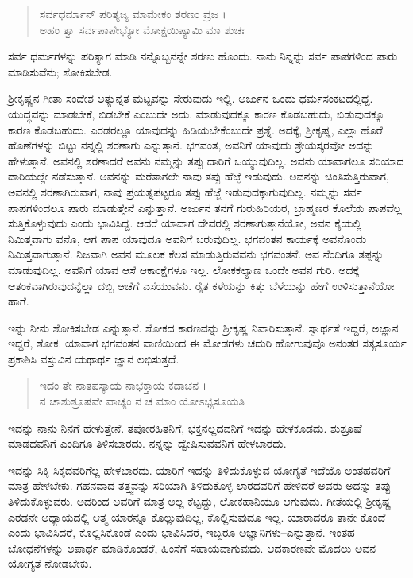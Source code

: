 \begin{verse}
ಸರ್ವಧರ್ಮಾನ್ ಪರಿತ್ಯಜ್ಯ ಮಾಮೇಕಂ ಶರಣಂ ವ್ರಜ ।\\ಅಹಂ ತ್ವಾ ಸರ್ವಪಾಪೇಭ್ಯೋ ಮೋಕ್ಷಯಿಷ್ಯಾಮಿ ಮಾ ಶುಚಃ 
\end{verse}

{\small ಸರ್ವ ಧರ್ಮಗಳನ್ನು ಪರಿತ್ಯಾಗ ಮಾಡಿ ನನ್ನೊಬ್ಬನನ್ನೇ ಶರಣು ಹೊಂದು. ನಾನು ನಿನ್ನನ್ನು ಸರ್ವ ಪಾಪಗಳಿಂದ ಪಾರು ಮಾಡಿಸುವೆನು; ಶೋಕಿಸಬೇಡ.}

ಶ್ರೀಕೃಷ್ಣನ ಗೀತಾ ಸಂದೇಶ ಅತ್ಯುನ್ನತ ಮಟ್ಟವನ್ನು ಸೇರುವುದು ಇಲ್ಲಿ. ಅರ್ಜುನ ಒಂದು ಧರ್ಮಸಂಕಟದಲ್ಲಿದ್ದ. ಯುದ್ಧವನ್ನು ಮಾಡಬೇಕೆ, ಬಿಡಬೇಕೆ ಎಂಬುದೇ ಅದು. ಮಾಡುವುದಕ್ಕೂ ಕಾರಣ ಕೊಡಬಹುದು, ಬಿಡುವುದಕ್ಕೂ ಕಾರಣ ಕೊಡಬಹುದು. ಎರಡರಲ್ಲೂ ಯಾವುದನ್ನು ಹಿಡಿಯಬೇಕೆಂಬುದೇ ಪ್ರಶ್ನೆ. ಅದಕ್ಕೆ, ಶ್ರೀಕೃಷ್ಣ, ಎಲ್ಲಾ ಹೊರೆ ಹೊಣೆಗಳನ್ನು ಬಿಟ್ಟು ನನ್ನಲ್ಲಿ ಶರಣಾಗು ಎನ್ನುತ್ತಾನೆ. ಭಗವಂತ, ಅವನಿಗೆ ಯಾವುದು ಶ್ರೇಯಸ್ಕರವೋ ಅದನ್ನು ಹೇಳುತ್ತಾನೆ. ಅವನಲ್ಲಿ ಶರಣಾದರೆ ಅವನು ನಮ್ಮನ್ನು ತಪ್ಪು ದಾರಿಗೆ ಒಯ್ಯುವುದಿಲ್ಲ. ಅವನು ಯಾವಾಗಲೂ ಸರಿಯಾದ ದಾರಿಯಲ್ಲೇ ನಡೆಸುತ್ತಾನೆ. ಅವನನ್ನು ಮರೆತಾಗಲೇ ನಾವು ತಪ್ಪು ಹೆಜ್ಜೆ ಇಡುವುದು. ಅವನನ್ನು ಚಿಂತಿಸುತ್ತಿರುವಾಗ, ಅವನಲ್ಲಿ ಶರಣಾಗಿರುವಾಗ, ನಾವು ಪ್ರಯತ್ನಪಟ್ಟರೂ ತಪ್ಪು ಹೆಜ್ಜೆ ಇಡುವುದಕ್ಕಾಗುವುದಿಲ್ಲ. ನಮ್ಮನ್ನು ಸರ್ವ ಪಾಪಗಳಿಂದಲೂ ಪಾರು ಮಾಡುತ್ತೇನೆ ಎನ್ನುತ್ತಾನೆ. ಅರ್ಜುನ ತನಗೆ ಗುರುಹಿರಿಯರ, ಬ್ರಾಹ್ಮಣರ ಕೊಲೆಯ ಪಾಪವೆಲ್ಲ ಸುತ್ತಿಕೊಳ್ಳುವುದು ಎಂದು ಭಾವಿಸಿದ್ದ. ಆದರೆ ಯಾವಾಗ ದೇವರಲ್ಲಿ ಶರಣಾಗುತ್ತಾನೆಯೋ, ಅವನ ಕೈಯಲ್ಲಿ ನಿಮಿತ್ತವಾಗು ವನೊ, ಆಗ ಪಾಪ ಯಾವುದೂ ಅವನಿಗೆ ಬರುವುದಿಲ್ಲ. ಭಗವಂತನ ಕಾರ್ಯಕ್ಕೆ ಅವನೊಂದು ನಿಮಿತ್ತವಾಗುತ್ತಾನೆ. ನಿಜವಾಗಿ ಅವನ ಮೂಲಕ ಕೆಲಸ ಮಾಡುತ್ತಿರುವವನು ಭಗವಂತನೆ. ಅವ ನೆಂದಿಗೂ ತಪ್ಪನ್ನು ಮಾಡುವುದಿಲ್ಲ. ಅವನಿಗೆ ಯಾವ ಆಸೆ ಆಕಾಂಕ್ಷೆಗಳೂ ಇಲ್ಲ. ಲೋಕಕಲ್ಯಾಣ ಒಂದೇ ಅವನ ಗುರಿ. ಅದಕ್ಕೆ ಆತಂಕವಾಗಿರುವುದನ್ನೆಲ್ಲಾ ದಬ್ಬಿ ಆಚೆಗೆ ಎಸೆಯುವನು. ರೈತ ಕಳೆಯನ್ನು ಕಿತ್ತು ಬೆಳೆಯನ್ನು ಹೇಗೆ ಉಳಿಸುತ್ತಾನೆಯೋ ಹಾಗೆ.

ಇನ್ನು ನೀನು ಶೋಕಿಸಬೇಡ ಎನ್ನುತ್ತಾನೆ. ಶೋಕದ ಕಾರಣವನ್ನು ಶ್ರೀಕೃಷ್ಣ ನಿವಾರಿಸುತ್ತಾನೆ. ಸ್ವಾರ್ಥತೆ ಇದ್ದರೆ, ಅಜ್ಞಾನ ಇದ್ದರೆ, ಶೋಕ. ಯಾವಾಗ ಭಗವಂತನ ವಾಣಿಯಿಂದ ಈ ಮೋಡಗಳು ಚದುರಿ ಹೋಗುವುವೊ ಅನಂತರ ಸತ್ಯಸೂರ್ಯ ಪ್ರಕಾಶಿಸಿ ವಸ್ತುವಿನ ಯಥಾರ್ಥ ಜ್ಞಾನ ಲಭಿಸುತ್ತದೆ.

\begin{verse}
ಇದಂ ತೇ ನಾತಪಸ್ಕಾಯ ನಾಭಕ್ತಾಯ ಕದಾಚನ ।\\ನ ಚಾಶುಶ್ರೂಷವೇ ವಾಚ್ಯಂ ನ ಚ ಮಾಂ ಯೋಽಭ್ಯಸೂಯತಿ 
\end{verse}

{\small ಇದನ್ನು ನಾನು ನಿನಗೆ ಹೇಳುತ್ತೇನೆ. ತಪೋರಹಿತನಿಗೆ, ಭಕ್ತನಲ್ಲದವನಿಗೆ ಇದನ್ನು ಹೇಳಕೂಡದು. ಶುಶ್ರೂಷೆ ಮಾಡದವನಿಗೆ ಎಂದಿಗೂ ತಿಳಿಸಬಾರದು. ನನ್ನನ್ನು ದ್ವೇಷಿಸುವವನಿಗೆ ಹೇಳಬಾರದು.}

ಇದನ್ನು ಸಿಕ್ಕಿ ಸಿಕ್ಕದವರಿಗೆಲ್ಲ ಹೇಳಬಾರದು. ಯಾರಿಗೆ ಇದನ್ನು ತಿಳಿದುಕೊಳ್ಳುವ ಯೋಗ್ಯತೆ ಇದೆಯೊ ಅಂತಹವರಿಗೆ ಮಾತ್ರ ಹೇಳಬೇಕು. ಗಹನವಾದ ತತ್ತ್ವವನ್ನು ಸರಿಯಾಗಿ ತಿಳಿದುಕೊಳ್ಳ ಲಾರದವರಿಗೆ ಹೇಳಿದರೆ ಅವರು ಅದನ್ನು ತಪ್ಪು ತಿಳಿದುಕೊಳ್ಳುವರು. ಅದರಿಂದ ಅವರಿಗೆ ಮಾತ್ರ ಅಲ್ಲ ಕೆಟ್ಟದ್ದು, ಲೋಕಹಾನಿಯೂ ಆಗುವುದು. ಗೀತೆಯಲ್ಲಿ ಶ್ರೀಕೃಷ್ಣ ಎರಡನೇ ಅಧ್ಯಾಯದಲ್ಲಿ ಆತ್ಮ ಯಾರನ್ನೂ ಕೊಲ್ಲುವುದಿಲ್ಲ, ಕೊಲ್ಲಿಸುವುದೂ ಇಲ್ಲ. ಯಾರಾದರೂ ತಾನೇ ಕೊಂದೆ ಎಂದು ಭಾವಿಸಿದರೆ, ಕೊಲ್ಲಿಸಿಕೊಂಡೆ ಎಂದು ಭಾವಿಸಿದರೆ, ಇಬ್ಬರೂ ಅಜ್ಞಾನಿಗಳು–ಎನ್ನುತ್ತಾನೆ. ಇಂತಹ ಬೋಧನೆಗಳನ್ನು ಅಪಾರ್ಥ ಮಾಡಿಕೊಂಡರೆ, ಹಿಂಸೆಗೆ ಸಹಾಯವಾಗುವುದು. ಆದಕಾರಣವೇ ಮೊದಲು ಅವನ ಯೋಗ್ಯತೆ ನೋಡಬೇಕು.

